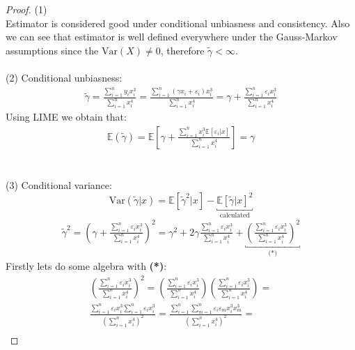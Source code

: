 \documentclass[12pt,reqno]{amsart}
\theoremstyle{plain}
\newcommand{\E}{\mathbb{E}}
\begin{document}
\begin{proof}
    (1)\\
    Estimator is considered good under conditional unbiasness and consistency. Also we can see that estimator is well defined everywhere under the Gauss-Markov assumptions since the
    $ \text{Var}(X) \ne 0 $,  therefore $ \tilde\gamma < \infty $.
    \\\\(2) Conditional unbiasness:
    \begin{gather*}
        \tilde{\gamma} = \frac{\sum_{i=1}^{n} y_i x_i^{3}}{\sum_{i=1}^{n} x_{i}^{4}} =
        \frac{\sum_{i=1}^{n} (\gamma x_{i} + \varepsilon_{i}) x_i^{3}}{\sum_{i=1}^{n} x_{i}^{4}} =
        \gamma + \frac{\sum_{i=1}^{n} \varepsilon_i x_i^{3}}{\sum_{i=1}^{n} x_{i}^{4}}
    \end{gather*}
    Using LIME we obtain that:
    \begin{gather*}
        \E (\tilde{\gamma}) = \E \left[  \gamma + \frac{\sum_{i=1}^{n} x_i^{3} \E \left[ \varepsilon_i | x \right] }{\sum_{i=1}^{n} x_{i}^{4}}\right] = \gamma
    \end{gather*}
    \\\\(3) Conditional variance:
    \[\text{Var}(\tilde{\gamma}|x) = \E \left[\tilde\gamma^{2}|x\right] - \underbracket{\E\left[\tilde{\gamma}| x\right]^{2}}_{\text{calculated}}\]
    \begin{gather*}
        \tilde{\gamma}^{2} = \left( \gamma + \frac{\sum_{i=1}^{n} \varepsilon_i x_i^{3}}{\sum_{i=1}^{n} x_{i}^{4}} \right)^{2} = \gamma^{2} + 2\gamma \frac{\sum_{i=1}^{n} \varepsilon_i x_i^{3}}{\sum_{i=1}^{n} x_{i}^{4}} + \underbracket{\left( \frac{\sum_{i=1}^{n} \varepsilon_i x_i^{3}}{\sum_{i=1}^{n} x_{i}^{4}} \right)^{2}}_{\textbf{(*)}}
    \end{gather*}
    Firstly lets do some algebra with \textbf{(*)}:
    \begin{gather*}
        \left( \frac{\sum_{i=1}^{n} \varepsilon_i x_i^{3}}{\sum_{i=1}^{n} x_{i}^{4}} \right)^{2} =
        \left( \frac{\sum_{i=1}^{n} \varepsilon_i x_i^{3}}{\sum_{i=1}^{n} x_{i}^{4}} \right)\left( \frac{\sum_{i=1}^{n} \varepsilon_i x_i^{3}}{\sum_{i=1}^{n} x_{i}^{4}} \right) = \\
        \frac{\sum_{i=1}^{n} \varepsilon_i x_i^{3} \sum_{i=1}^{n} \varepsilon_i x_i^{3}}{\left(\sum_{i=1}^{n} x_{i}^{4}\right)^{2}} =
        \frac{\sum_{i=1}^{n}\sum_{m=1}^{n}  \varepsilon_i \varepsilon_m x_i^{3} x_m^{3}  }{\left(\sum_{i=1}^{n} x_{i}^{4}\right)^{2}} = \\

\end{gather*}
\end{proof}
\end{document}
